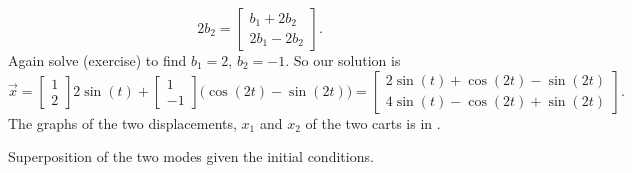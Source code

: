 \begin{example}
\begin{equation*}
2 b_2
=
\begin{bmatrix} b_1+2b_2 \\ 2b_1-2b_2 \end{bmatrix} .
\end{equation*}
Again solve (exercise) to find  $b_1 = 2$, $b_2 = -1$.  So our solution is
\begin{equation*}
\vec{x} = 
\begin{bmatrix} 1 \\ 2 \end{bmatrix}
2 \sin (t)
+
\begin{bmatrix} 1 \\ -1 \end{bmatrix}
\bigl( \cos (2t) - \sin (2t) \bigr)
=
\begin{bmatrix}
2 \sin (t) + \cos(2t)- \sin(2t) \\
4 \sin (t) - \cos(2t) + \sin(2t)
\end{bmatrix} .
\end{equation*}
The graphs of the two displacements, $x_1$ and $x_2$ of the two carts is in
.
\begin{myfig}
\capstart
{}
\caption{Superposition of the two modes given the initial
conditions.\label{sosa:superposfig}}
\end{myfig}
\end{example}


